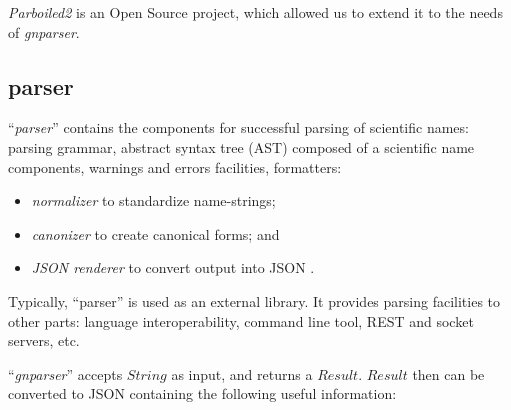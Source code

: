\documentclass{bmcart}
\newcommand{\comment}[2]{\hspace{0in}#2}
\begin{document}
\textit{Parboiled2} is an Open Source project, which allowed us to extend
\comment{dima: would be good to add a few sentences to describe the extensions}
it to the needs of \textit{gnparser}.


\subsection*{parser}

``\textit{parser}'' contains the components for successful parsing of scientific
names: parsing grammar, abstract syntax tree (AST) composed of a scientific
name components, warnings and errors facilities, formatters:

\begin{itemize}

  \item \textit{normalizer} to standardize name-strings;

  \item \textit{canonizer} to create canonical forms; and

  \item \textit{JSON renderer} to convert output into JSON
    \cite{bray2014javascript}.

\end{itemize}

Typically, ``parser'' is used as an external library. It provides parsing
facilities to other parts: language interoperability, command line tool, REST
and socket servers, etc.



``\textit{gnparser}'' accepts $String$ as input, and returns a $Result$.
$Result$ then can be converted to JSON containing the following useful
information:

\end{document}
